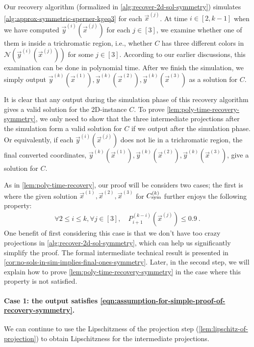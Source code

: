 Our recovery algorithm (formalized in \cref{alg:recover-2d-sol-symmetry}) simulates \cref{alg:approx-symmetric-sperner-kgeq3} for each $\vec{x}^{(j)}$.
At time $i\in [2,k-1]$ when we have computed $\vec{y}^{(i)}(\vec{x}^{(j)})$ for each $j\in [3]$, we examine whether one of them is inside a trichromatic region, i.e., whether $C$ has three different colors in $\mathcal{N}(\vec{y}^{(i)}(\vec{x}^{(j)}))$ for some $j\in [3]$.
According to our earlier discussions, this examination can be done in polynomial time.
After we finish the simulation, we simply output $\vec{y}^{(k)}(\vec{x}^{(1)}), \vec{y}^{(k)}(\vec{x}^{(2)}), \vec{y}^{(k)}(\vec{x}^{(3)})$ as a solution for $C$. 


It is clear that any output during the simulation phase of this recovery algorithm gives a valid solution for the 2{\rm D}-\Sperner instance $C$. 
To prove \cref{lem:poly-time-recovery-symmetry}, we only need to show that the three intermediate projections after the simulation form a valid solution for $C$ if we output after the simulation phase. 
Or equivalently, if each $\vec{y}^{(i)}(\vec{x}^{(j)})$ does not lie in a trichromatic region, the final converted coordinates, $\vec{y}^{(k)}(\vec{x}^{(1)}), \vec{y}^{(k)}(\vec{x}^{(2)}), \vec{y}^{(k)}(\vec{x}^{(3)})$, give a solution for $C$.

As in \cref{lem:poly-time-recovery}, our proof will be considers two cases; the first is where
the given solution $\vec{x}^{(1)}, \vec{x}^{(2)}, \vec{x}^{(3)}$  for $C_{\rm sym}^{(k)}$ further enjoys the following property: 
\begin{align}
\label{eqn:assumption-for-simple-proof-of-recovery-symmetry}
\forall 2\leq i\leq k, \forall j\in [3], \quad P_{i+1}^{(k-i)}(\vec{x}^{(j)})\leq 0.9~.
\end{align}
One benefit of first considering this case is that we don't have too crazy projections in \cref{alg:recover-2d-sol-symmetry}, which can help us significantly simplify the proof.
The formal intermediate technical result is presented in \cref{cor:no-sols-in-sim-implies-final-ones-symmetry}.
Later, in the second step, we will explain how to prove \cref{lem:poly-time-recovery-symmetry} in the  case where this property is not satisfied.

\paragraph{Case 1: the output satisfies \cref{eqn:assumption-for-simple-proof-of-recovery-symmetry}.}
We can continue to use the Lipschitzness of the projection step (\cref{lem:lipschitz-of-projection}) to obtain Lipschitzness for the intermediate projections.

